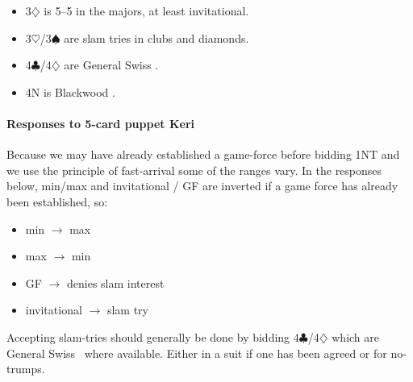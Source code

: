 \documentclass[a4paper,14pt]{extarticle}
\begin{document}
\begin{itemize}
\item 3$\diamondsuit$ is 5--5 in the majors, at least invitational.

\item 3$\heartsuit$/3$\spadesuit$ are slam tries in clubs and diamonds.

\item 4$\clubsuit$/4$\diamondsuit$ are General Swiss .

\item 4N is Blackwood .

\end{itemize}

\paragraph{Responses to 5-card puppet Keri}
\label{note:8a}

Because we may have already established a game-force before bidding 1NT and we
use the principle of fast-arrival some of the ranges vary. In the responses
below, min/max and invitational / GF are inverted if a game force has already
been established, so:

\begin{itemize}
\item min $\rightarrow$ max
\item max $\rightarrow$ min
\item GF $\rightarrow$ denies slam interest
\item invitational $\rightarrow$ slam try
\end{itemize}

Accepting slam-tries should generally be done by bidding
4$\clubsuit$/4$\diamondsuit$ which are General Swiss~ where
available. Either in a suit if one has been agreed or for no-trumps.
\end{document}
